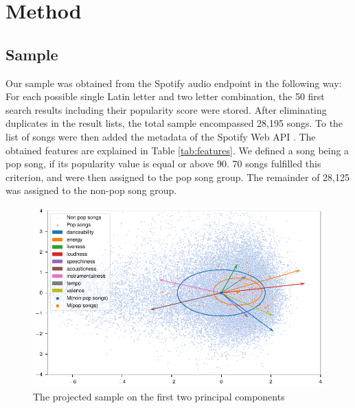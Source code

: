 \documentclass{article}
\begin{document}
\section{Method}

\subsection{Sample}
Our sample was obtained from the Spotify audio endpoint in the following way: For each possible single Latin letter and two letter combination, the 50 first search results including their popularity score were stored. After eliminating duplicates in the result lists, the total sample encompassed 28,195 songs. To the list of songs were then added the metadata of the Spotify Web API \citep{spotifyDocu}.
The obtained features are explained in Table \ref{tab:features}. We defined a song being a pop song, if its popularity value is equal or above 90. 70 songs fulfilled this criterion, and were then assigned to the pop song group. The remainder of 28,125 was assigned to the non-pop song group. 

\begin{figure}[!b]
  \centering
  \includegraphics[]{../fig/001_pca.pdf}
  \vspace*{-8mm}  
  \caption{The projected sample on the first two principal components}
  \label{fig:pca}
\end{figure}
\end{document}
